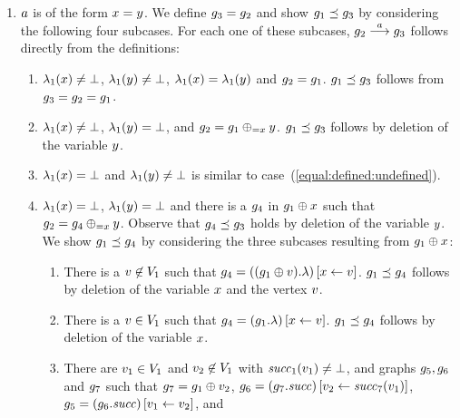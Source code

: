 \begin{enumerate}
\item
$a$ is of the form $x=y$.
%
We define $g_3=g_2$ and
show $g_1\preceq g_3$ by considering 
the following four subcases.
%
For each one of these subcases, $g_2\stackrel{a}{\longrightarrow}g_3$ 
follows directly from the definitions:
\begin{enumerate}
\item
$\lambda_1(x)\neq\bot$, 
$\lambda_1(y)\neq\bot$,
$\lambda_1(x)=\lambda_1(y)$ and 
$g_2=g_1$.
%
$g_1\preceq g_3$ follows from $g_3=g_2=g_1$.
\item
\label{equal:defined:undefined}
$\lambda_1(x)\neq\bot$, $\lambda_1(y)=\bot$, and
$g_2=g_1\oplus_{={x}}{y}$.
%
%
$g_1\preceq g_3$ follows by deletion of the variable $y$.
\item $\lambda_1(x)=\bot$ and $\lambda_1(y)\neq\bot$ 
is similar to case~(\ref{equal:defined:undefined}).
\item
$\lambda_1(x)=\bot$, $\lambda_1(y)=\bot$
and there is a $g_4$ in 
$g_1\oplus{\ensuremath{x}}$ such that
$g_2=g_4\oplus_{={x}}{y}$.
%
Observe that $g_4\preceq g_3$ holds by deletion of the variable $y$.
%
We show $g_1\preceq g_4$ by considering the three subcases 
resulting from $g_1\oplus{\ensuremath{x}}$:
%
\begin{enumerate}
\item
\label{equal:undefined:undefined:addisolated}
There is a $v\not\in V_1$ such that
$g_4=\left((g_1\oplus{\ensuremath{v}}).\lambda\right)\left[x\leftarrow v\right]$.
%
$g_1\preceq g_4$ follows by deletion of the variable $x$ 
and the vertex $v$.
\item
\label{equal:undefined:undefined:addvariable}
There is a $v\in V_1$ such that
$g_4=\left(g_1.\lambda\right)\left[x\leftarrow v\right]$.
%
$g_1\preceq g_4$ follows by deletion of the variable $x$.
\item
\label{equal:undefined:undefined:addsimple}
There are $v_1\in V_1$ 
and $v_2\not\in V_1$ with ${\it succ}_1(v_1)\neq\bot$, 
and graphs $g_5,g_6$ and $g_7$ such that
$g_7=g_1\oplus{\ensuremath{v}_2}$,
$g_6=\left(g_7.{\it succ}\right)\left[v_2\leftarrow{\it succ}_7(v_1)\right]$,
$g_5=\left(g_6.{\it succ}\right)\left[v_1\leftarrow v_2\right]$, and

\end{enumerate}
\end{enumerate}
\end{enumerate}
